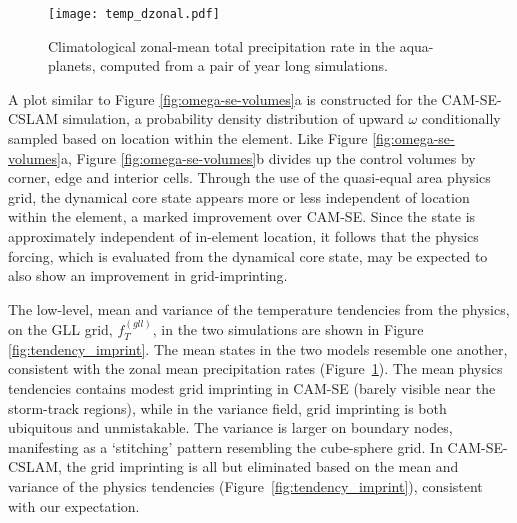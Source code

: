 \documentclass{ametsoc}
\begin{document}
\begin{figure}[t]
\begin{center}
\noindent\texttt{[image: temp\_dzonal.pdf]}\\
\end{center}
\caption{Climatological zonal-mean total precipitation rate in the aqua-planets, computed from a pair of year long simulations.}
\label{fig:zonal}
\end{figure}

A plot similar to Figure \ref{fig:omega-se-volumes}a is constructed for the CAM-SE-CSLAM simulation, a probability density distribution of upward $\omega$ conditionally sampled based on location within the element. Like Figure \ref{fig:omega-se-volumes}a, Figure \ref{fig:omega-se-volumes}b divides up the control volumes by corner, edge and interior cells. Through the use of the quasi-equal area physics grid, the dynamical core state appears more or less independent of location within the element, a marked improvement over CAM-SE. Since the state is approximately independent of in-element location, it follows that the physics forcing, which is evaluated from the dynamical core state, may be expected to also show an improvement in grid-imprinting. 

The low-level, mean and variance of the temperature tendencies from the physics, on the GLL grid, $f_T^{(gll)}$, in the two simulations are shown in Figure \ref{fig:tendency_imprint}. The mean states in the two models resemble one another, consistent with the zonal mean precipitation rates (Figure~\ref{fig:zonal}). The mean physics tendencies contains modest grid imprinting in CAM-SE (barely visible near the storm-track regions), while in the variance field, grid imprinting is both ubiquitous and unmistakable. The variance is larger on boundary nodes, manifesting as a `stitching' pattern resembling the cube-sphere grid. In CAM-SE-CSLAM, the grid imprinting is all but eliminated based on the mean and variance of the physics tendencies (Figure~\ref{fig:tendency_imprint}), consistent with our expectation.
\end{document}
